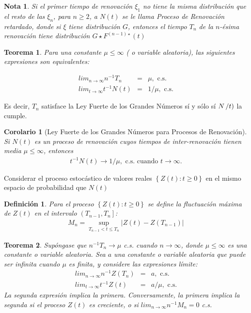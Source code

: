 \documentclass{article}
\newtheorem{Def}{Definición}
\newtheorem{Teo}{Teorema}
\newtheorem{Note}{Nota}
\newtheorem{Coro}{Corolario}
\begin{document}
\begin{Note}
Si el primer tiempo de renovaci\'on $\xi_{1}$ no tiene la misma distribuci\'on que el resto de las $\xi_{n}$, para $n\geq2$, a $N\left(t\right)$ se le llama Proceso de Renovaci\'on retardado, donde si $\xi$ tiene distribuci\'on $G$, entonces el tiempo $T_{n}$ de la $n$-\'esima renovaci\'on tiene distribuci\'on $G\star F^{\left(n-1\right)\star}\left(t\right)$
\end{Note}


\begin{Teo}
Para una constante $\mu\leq\infty$ ( o variable aleatoria), las siguientes expresiones son equivalentes:

\begin{eqnarray}
lim_{n\rightarrow\infty}n^{-1}T_{n}&=&\mu,\textrm{ c.s.}\\
lim_{t\rightarrow\infty}t^{-1}N\left(t\right)&=&1/\mu,\textrm{ c.s.}
\end{eqnarray}
\end{Teo}


Es decir, $T_{n}$ satisface la Ley Fuerte de los Grandes N\'umeros s\'i y s\'olo s\'i $N\left/t\right)$ la cumple.


\begin{Coro}[Ley Fuerte de los Grandes N\'umeros para Procesos de Renovaci\'on]
Si $N\left(t\right)$ es un proceso de renovaci\'on cuyos tiempos de inter-renovaci\'on tienen media $\mu\leq\infty$, entonces
\begin{eqnarray}
t^{-1}N\left(t\right)\rightarrow 1/\mu,\textrm{ c.s. cuando }t\rightarrow\infty.
\end{eqnarray}

\end{Coro}


Considerar el proceso estoc\'astico de valores reales $\left\{Z\left(t\right):t\geq0\right\}$ en el mismo espacio de probabilidad que $N\left(t\right)$

\begin{Def}
Para el proceso $\left\{Z\left(t\right):t\geq0\right\}$ se define la fluctuaci\'on m\'axima de $Z\left(t\right)$ en el intervalo $\left(T_{n-1},T_{n}\right]$:
\begin{eqnarray*}
M_{n}=\sup_{T_{n-1}<t\leq T_{n}}|Z\left(t\right)-Z\left(T_{n-1}\right)|
\end{eqnarray*}
\end{Def}

\begin{Teo}
Sup\'ongase que $n^{-1}T_{n}\rightarrow\mu$ c.s. cuando $n\rightarrow\infty$, donde $\mu\leq\infty$ es una constante o variable aleatoria. Sea $a$ una constante o variable aleatoria que puede ser infinita cuando $\mu$ es finita, y considere las expresiones l\'imite:
\begin{eqnarray}
lim_{n\rightarrow\infty}n^{-1}Z\left(T_{n}\right)&=&a,\textrm{ c.s.}\\
lim_{t\rightarrow\infty}t^{-1}Z\left(t\right)&=&a/\mu,\textrm{ c.s.}
\end{eqnarray}
La segunda expresi\'on implica la primera. Conversamente, la primera implica la segunda si el proceso $Z\left(t\right)$ es creciente, o si $lim_{n\rightarrow\infty}n^{-1}M_{n}=0$ c.s.
\end{Teo}
\end{document}
